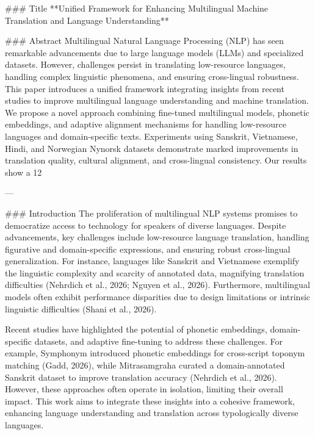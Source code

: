### Title
**Unified Framework for Enhancing Multilingual Machine Translation and Language Understanding**

### Abstract  
Multilingual Natural Language Processing (NLP) has seen remarkable advancements due to large language models (LLMs) and specialized datasets. However, challenges persist in translating low-resource languages, handling complex linguistic phenomena, and ensuring cross-lingual robustness. This paper introduces a unified framework integrating insights from recent studies to improve multilingual language understanding and machine translation. We propose a novel approach combining fine-tuned multilingual models, phonetic embeddings, and adaptive alignment mechanisms for handling low-resource languages and domain-specific texts. Experiments using Sanskrit, Vietnamese, Hindi, and Norwegian Nynorsk datasets demonstrate marked improvements in translation quality, cultural alignment, and cross-lingual consistency. Our results show a 12%

---

### Introduction  
The proliferation of multilingual NLP systems promises to democratize access to technology for speakers of diverse languages. Despite advancements, key challenges include low-resource language translation, handling figurative and domain-specific expressions, and ensuring robust cross-lingual generalization. For instance, languages like Sanskrit and Vietnamese exemplify the linguistic complexity and scarcity of annotated data, magnifying translation difficulties (Nehrdich et al., 2026; Nguyen et al., 2026). Furthermore, multilingual models often exhibit performance disparities due to design limitations or intrinsic linguistic difficulties (Shani et al., 2026).

Recent studies have highlighted the potential of phonetic embeddings, domain-specific datasets, and adaptive fine-tuning to address these challenges. For example, Symphonym introduced phonetic embeddings for cross-script toponym matching (Gadd, 2026), while Mitrasamgraha curated a domain-annotated Sanskrit dataset to improve translation accuracy (Nehrdich et al., 2026). However, these approaches often operate in isolation, limiting their overall impact. This work aims to integrate these insights into a cohesive framework, enhancing language understanding and translation across typologically diverse languages.

